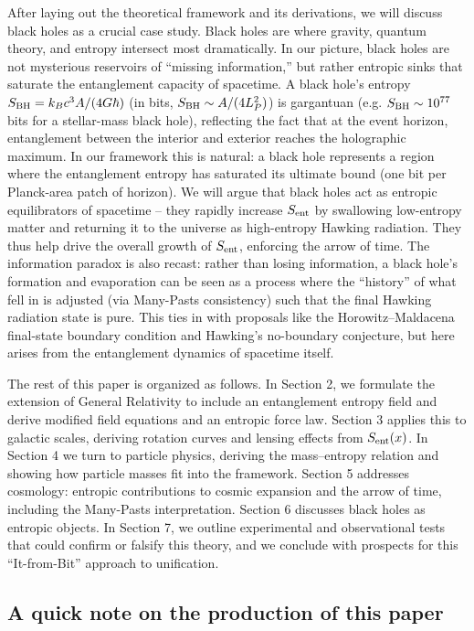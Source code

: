 \documentclass[11pt]{article}
\begin{document}
After laying out the theoretical framework and its derivations, we will discuss black holes as a crucial case study. Black holes are where gravity, quantum theory, and entropy intersect most dramatically. In our picture, black holes are not mysterious reservoirs of “missing information,” but rather entropic sinks that saturate the entanglement capacity of spacetime. A black hole’s entropy $S_{\rm BH} = k_B c^3 A/(4G\hbar)$ (in bits, $S_{\rm BH} \sim A/(4L_P^2)$) is gargantuan (e.g. $S_{\rm BH}\sim10^{77}$ bits for a stellar-mass black hole), reflecting the fact that at the event horizon, entanglement between the interior and exterior reaches the holographic maximum. In our framework this is natural: a black hole represents a region where the entanglement entropy has saturated its ultimate bound (one bit per Planck-area patch of horizon). We will argue that black holes act as entropic equilibrators of spacetime – they rapidly increase $S_{\rm ent}$ by swallowing low-entropy matter and returning it to the universe as high-entropy Hawking radiation. They thus help drive the overall growth of $S_{\rm ent}$, enforcing the arrow of time. The information paradox is also recast: rather than losing information, a black hole’s formation and evaporation can be seen as a process where the “history” of what fell in is adjusted (via Many-Pasts consistency) such that the final Hawking radiation state is pure. This ties in with proposals like the Horowitz–Maldacena final-state boundary condition and Hawking’s no-boundary conjecture, but here arises from the entanglement dynamics of spacetime itself.

The rest of this paper is organized as follows. In Section 2, we formulate the extension of General Relativity to include an entanglement entropy field and derive modified field equations and an entropic force law. Section 3 applies this to galactic scales, deriving rotation curves and lensing effects from $S_{\rm ent}(x)$. In Section 4 we turn to particle physics, deriving the mass–entropy relation and showing how particle masses fit into the framework. Section 5 addresses cosmology: entropic contributions to cosmic expansion and the arrow of time, including the Many-Pasts interpretation. Section 6 discusses black holes as entropic objects. In Section 7, we outline experimental and observational tests that could confirm or falsify this theory, and we conclude with prospects for this “It-from-Bit” approach to unification.

\subsection*{A quick note on the production of this paper} %
\end{document}
